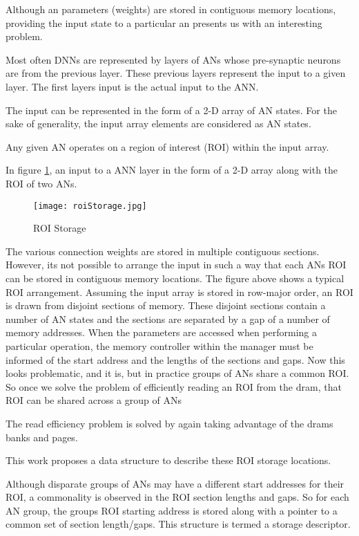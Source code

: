 Although \ac{an} parameters (weights) are stored in contiguous memory locations, providing the input state to a particular \ac{an} presents us with an interesting problem.

Most often DNNs are represented by layers of ANs whose pre-synaptic neurons are from the previous layer. These previous layers represent the input to a given layer. The first layers input is the actual input to the ANN.


The input can be represented in the form of a 2-D array of AN states. For the sake of generality, the input array elements are considered as AN states.

Any given AN operates on a region of interest (ROI) within the input array.

In figure \ref{fig:roiStorage}, an input to a ANN layer in the form of a 2-D array along with the ROI of two ANs.

\begin{figure}[!t]
\centering
\captionsetup{justification=centering}
\captionsetup{width=.9\linewidth}
\centerline{
\mbox{\texttt{[image: roiStorage.jpg]}}
}
\caption{ROI Storage}
\label{fig:roiStorage}
\end{figure}

The various connection weights are stored in multiple contiguous sections. However, its not possible to arrange the input in such a way that each ANs ROI can be stored in contiguous memory locations. The figure above shows a typical ROI arrangement. Assuming the input array is stored in row-major order, an ROI is drawn from disjoint sections of memory. 
These disjoint sections contain a number of AN states and the sections are separated by a gap of a number of memory addresses. When the parameters are accessed when performing a particular operation, the memory controller within the manager must be informed of the start address and the lengths of the sections and gaps. Now this looks problematic, and it is, but in practice groups of ANs share a common ROI. So once we solve the problem of efficiently reading an ROI from the \ac{dram}, that ROI can be shared across a group of ANs

The read efficiency problem is solved by again taking advantage of the \ac{dram}s banks and pages.

This work proposes a data structure to describe these ROI storage locations.

Although disparate groups of ANs may have a different start addresses for their ROI, a commonality is observed in the ROI section lengths and gaps. So for each AN group, the groups ROI starting address is stored along with a pointer to a common set of section length/gaps. This structure is termed a storage descriptor.

